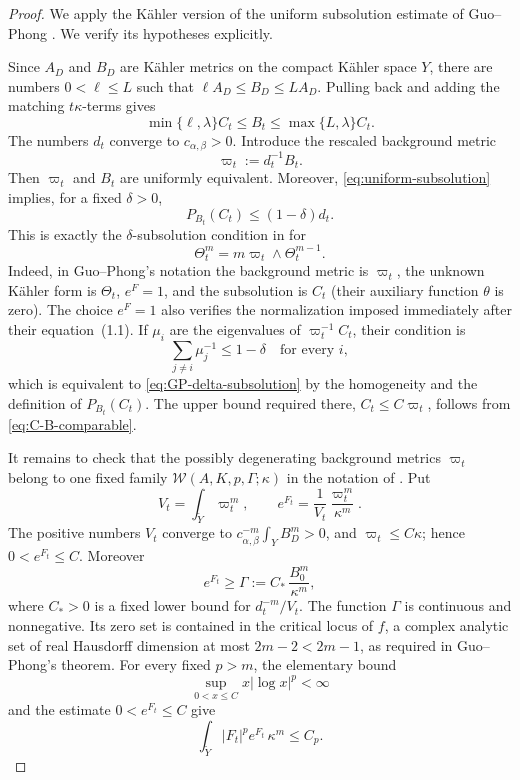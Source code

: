 \documentclass[reqno]{amsart}
\newcommand{\cab}{c_{\alpha,\beta}}
\theoremstyle{plain}
\theoremstyle{remark}
\begin{document}
\begin{proof}
We apply the K\"ahler version of the uniform subsolution estimate of
Guo--Phong \cite[Theorem~4.1 and Example~4.1.1]{GP24}.  We verify
its hypotheses explicitly.

Since $A_D$ and $B_D$ are K\"ahler metrics on the compact
K\"ahler space $Y$, there are numbers $0<\ell\leq L$ such that
$\ell A_D\leq B_D\leq LA_D$.  Pulling back and adding the matching
$t\kappa$-terms gives
\begin{equation}\label{eq:C-B-comparable}
 \min\{\ell,\lambda\}C_t
 \leq B_t\leq
 \max\{L,\lambda\}C_t.
\end{equation}
The numbers $d_t$ converge to $\cab>0$.  Introduce the rescaled
background metric
\[
 \varpi_t:=d_t^{-1}B_t.
\]
Then $\varpi_t$ and $B_t$ are uniformly equivalent.  Moreover,
\eqref{eq:uniform-subsolution} implies, for a fixed $\delta>0$,
\begin{equation}\label{eq:GP-delta-subsolution}
 P_{B_t}(C_t)\leq(1-\delta)d_t.
\end{equation}
This is exactly the $\delta$-subsolution condition in
\cite[Section~4.1.1]{GP24} for
\begin{equation}\label{eq:GP-J-form}
 \Theta_t^m=m\varpi_t\wedge\Theta_t^{m-1}.
\end{equation}
Indeed, in Guo--Phong's notation the background metric is $\varpi_t$,
the unknown K\"ahler form is $\Theta_t$, $e^F=1$, and the
subsolution is $C_t$ (their auxiliary function $\theta$ is zero).
The choice $e^F=1$ also verifies the normalization imposed immediately
after their equation~(1.1).  If $\mu_i$ are the eigenvalues of
$\varpi_t^{-1}C_t$, their condition
is
\[
 \sum_{j\ne i}\mu_j^{-1}\leq1-\delta
 \quad\text{for every }i,
\]
which is equivalent to \eqref{eq:GP-delta-subsolution} by the
homogeneity and the definition of $P_{B_t}(C_t)$.
The upper bound required there, $C_t\leq C\varpi_t$, follows from
\eqref{eq:C-B-comparable}.

It remains to check that the possibly degenerating background metrics
$\varpi_t$ belong to one fixed family
$\mathcal W(A,K,p,\Gamma;\kappa)$ in the notation of
\cite[Equation~(2.5)]{GP24}.  Put
\[
 V_t=\int_{\widetilde Y}\varpi_t^m,
 \qquad
 e^{F_t}=\frac1{V_t}\frac{\varpi_t^m}{\kappa^m}.
\]
The positive numbers $V_t$ converge to
$\cab^{-m}\int_Y B_D^m>0$, and $\varpi_t\leq C\kappa$; hence
$0<e^{F_t}\leq C$.  Moreover
\begin{equation}\label{eq:density-lower}
 e^{F_t}\geq
 \Gamma:=C_*\,\frac{B_0^m}{\kappa^m},
\end{equation}
where $C_*>0$ is a fixed lower bound for
$d_t^{-m}/V_t$.
The function $\Gamma$ is continuous and nonnegative.  Its zero set
is contained in the critical locus of $f$, a complex analytic set of
real Hausdorff dimension at most $2m-2<2m-1$, as required in
Guo--Phong's theorem. For every fixed $p>m$, the elementary bound
\[
 \sup_{0<x\leq C}x|\log x|^p<\infty
\]
and the estimate $0<e^{F_t}\leq C$ give
\[
 \int_{\widetilde Y}|F_t|^p e^{F_t}\,\kappa^m\leq C_p.
\]


\end{proof}
\end{document}
